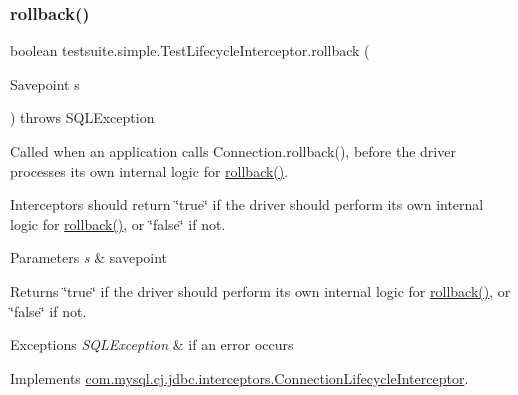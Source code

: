 \subsubsection{\texorpdfstring{rollback()}{rollback()}\hspace{0.1cm}{\footnotesize\ttfamily [2/2]}}
{\footnotesize\ttfamily boolean testsuite.\+simple.\+Test\+Lifecycle\+Interceptor.\+rollback (\begin{DoxyParamCaption}\item[{Savepoint}]{s }\end{DoxyParamCaption}) throws S\+Q\+L\+Exception}

Called when an application calls Connection.\+rollback(), before the driver processes its own internal logic for \mbox{\hyperlink{classtestsuite_1_1simple_1_1_test_lifecycle_interceptor_a7cdeb42f7891e22dadce89627befbcdf}{rollback()}}.

Interceptors should return \char`\"{}true\char`\"{} if the driver should perform its own internal logic for \mbox{\hyperlink{classtestsuite_1_1simple_1_1_test_lifecycle_interceptor_a7cdeb42f7891e22dadce89627befbcdf}{rollback()}}, or \char`\"{}false\char`\"{} if not.


\begin{DoxyParams}{Parameters}
{\em s} & savepoint \\
\hline
\end{DoxyParams}
\begin{DoxyReturn}{Returns}
\char`\"{}true\char`\"{} if the driver should perform its own internal logic for \mbox{\hyperlink{classtestsuite_1_1simple_1_1_test_lifecycle_interceptor_a7cdeb42f7891e22dadce89627befbcdf}{rollback()}}, or \char`\"{}false\char`\"{} if not.
\end{DoxyReturn}

\begin{DoxyExceptions}{Exceptions}
{\em S\+Q\+L\+Exception} & if an error occurs \\
\hline
\end{DoxyExceptions}


Implements \mbox{\hyperlink{interfacecom_1_1mysql_1_1cj_1_1jdbc_1_1interceptors_1_1_connection_lifecycle_interceptor_a1f2f30024dbf49bcfde29842f5e2d677}{com.\+mysql.\+cj.\+jdbc.\+interceptors.\+Connection\+Lifecycle\+Interceptor}}.

\mbox{\label{classtestsuite_1_1simple_1_1_test_lifecycle_interceptor_a98376ea207527feed3bc76d491c98cc2}} 
